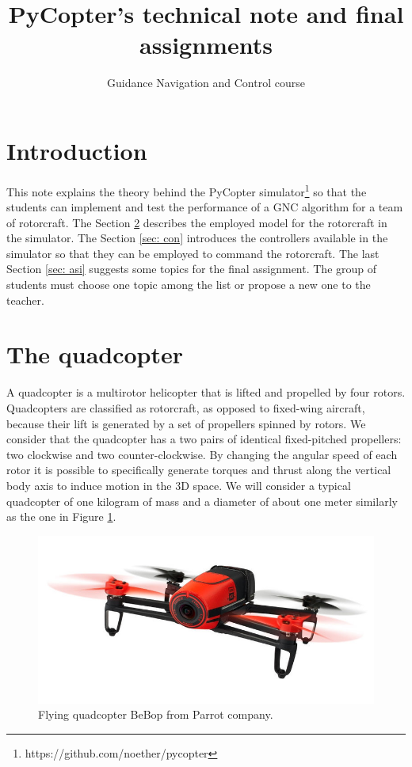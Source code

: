 \documentclass[a4paper, onecolumn]{ieeeconf}
\title{\LARGE \bf
PyCopter's technical note and final assignments
}
\author{Guidance Navigation and Control course}
\begin{document}
\maketitle
\thispagestyle{empty}
\pagestyle{empty}

\section{Introduction}
This note explains the theory behind the PyCopter simulator\footnote{https://github.com/noether/pycopter} so that the students can implement and test the performance of a GNC algorithm for a team of rotorcraft. The Section \ref{sec: quad} describes the employed model for the rotorcraft in the simulator. The Section \ref{sec: con} introduces the controllers available in the simulator so that they can be employed to command the rotorcraft. The last Section \ref{sec: asi} suggests some topics for the final assignment. The group of students must choose one topic among the list or propose a new one to the teacher.

\section{The quadcopter}
\label{sec: quad}
A quadcopter is a multirotor helicopter that is lifted and propelled by four rotors. Quadcopters are classified as rotorcraft, as opposed to fixed-wing aircraft, because their lift is generated by a set of propellers spinned by rotors. We consider that the quadcopter has a two pairs of identical fixed-pitched propellers: two clockwise and two counter-clockwise. By changing the angular speed of each rotor it is possible to specifically generate torques and thrust along the vertical body axis to induce motion in the 3D space. We will consider a typical quadcopter of one kilogram of mass and a diameter of about one meter similarly as the one in Figure \ref{fig: quad}.
\begin{figure}
\centering
\includegraphics[scale=1]{quad.jpg}
\caption{Flying quadcopter BeBop from Parrot company.}
\label{fig: quad}
\end{figure}
\end{document}
